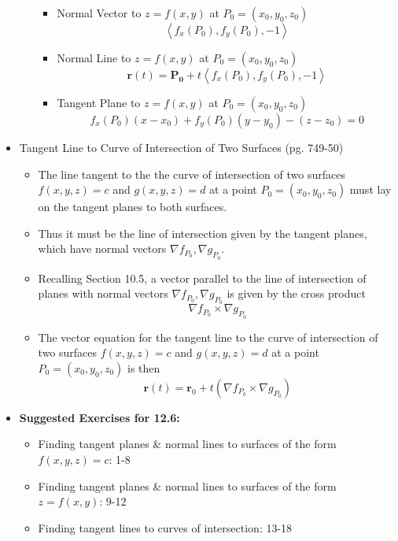 \documentclass[12pt]{article}
\theoremstyle{plain}
\theoremstyle{definition}
\theoremstyle{remark}
\newcommand{\vect}[1]{\mathbf{#1}}
\begin{document}
\begin{itemize}
\begin{itemize}
\begin{itemize}
			\item Normal Vector to $z=f(x,y)$ at $P_0=(x_0,y_0,z_0)$
			\[\left<f_x(P_0),f_y(P_0),-1\right>\]
			\item Normal Line to $z=f(x,y)$ at $P_0=(x_0,y_0,z_0)$
			\[\vect{r}(t) = \vect{P_0} + t\left<f_x(P_0),f_y(P_0),-1\right>\]
			\item Tangent Plane to $z=f(x,y)$ at $P_0=(x_0,y_0,z_0)$
			\[f_x(P_0)(x-x_0)+f_y(P_0)(y-y_0)-(z-z_0)=0\]
			\end{itemize}
		\end{itemize}
		
	\item Tangent Line to Curve of Intersection of Two Surfaces (pg. 749-50)
	
		\begin{itemize}
		\item The line tangent to the the curve of intersection of two surfaces $f(x,y,z)=c$ and $g(x,y,z)=d$ at a point $P_0=(x_0,y_0,z_0)$ must lay on the tangent planes to both surfaces.
		\item Thus it must be the line of intersection given by the tangent planes, which have normal vectors $\nabla f_{P_0},\nabla g_{P_0}$.
		\item Recalling Section 10.5, a vector parallel to the line of intersection of planes with normal vectors $\nabla f_{P_0},\nabla g_{P_0}$ is given by the cross product \[\nabla f_{P_0}\times\nabla g_{P_0}\]
		\item The vector equation for the tangent line to the curve of intersection of two surfaces $f(x,y,z)=c$ and $g(x,y,z)=d$ at a point $P_0=(x_0,y_0,z_0)$ is then \[\vect{r}(t) = \vect{r}_0 + t(\nabla f_{P_0}\times\nabla g_{P_0})\]
		\end{itemize}
		
	\item \textbf{Suggested Exercises for 12.6:}
	
		\begin{itemize}
		\item Finding tangent planes \& normal lines to surfaces of the form $f(x,y,z)=c$: 1-8
		\item Finding tangent planes \& normal lines to surfaces of the form $z=f(x,y)$: 9-12
		\item Finding tangent lines to curves of intersection: 13-18
		\end{itemize}
		
	\end{itemize}
	
	\newpage
	
\end{document}
